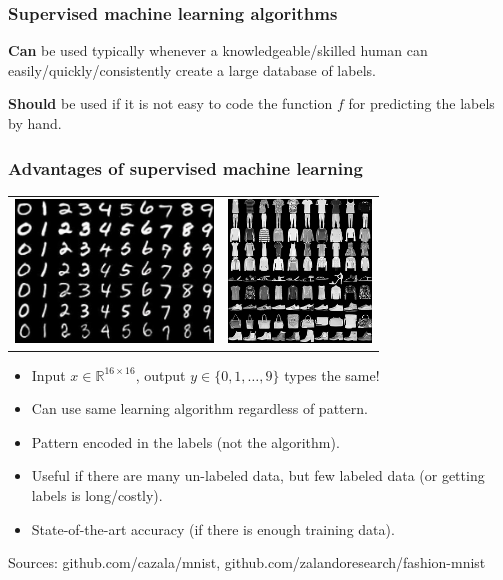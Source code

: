 \documentclass{beamer}
\newcommand{\RR}{\mathbb R}
\begin{document}
\begin{frame}
  \frametitle{Supervised machine learning algorithms}

  \textbf{Can} be used typically whenever a knowledgeable/skilled
  human can easily/quickly/consistently create a large database of
  labels.

  \vskip 1in

  \textbf{Should} be used if it is not easy to code the function $f$
  for predicting the labels by hand.

\end{frame}



\begin{frame}
  \frametitle{Advantages of supervised machine learning}

  \begin{center}
      \begin{tabular}{cc}
        \includegraphics[height=1.5in]{mnist-digits} &
  \includegraphics[height=1.5in]{fashion-mnist-sprite-some}  
  \end{tabular}
  \end{center}
  \vskip -0.2cm
  
  \begin{itemize}
  \item Input $x\in\RR^{16\times 16}$, output $y\in\{0,1,\dots,9\}$ types the same!
  \item Can use same learning algorithm regardless of pattern.
  \item Pattern encoded in the labels (not the algorithm).
  \item Useful if there are many un-labeled data, but few labeled data
    (or getting labels is long/costly).
  \item State-of-the-art accuracy (if there is enough training data).
  \end{itemize}

  \scriptsize Sources: github.com/cazala/mnist, github.com/zalandoresearch/fashion-mnist

\end{frame}
\end{document}
